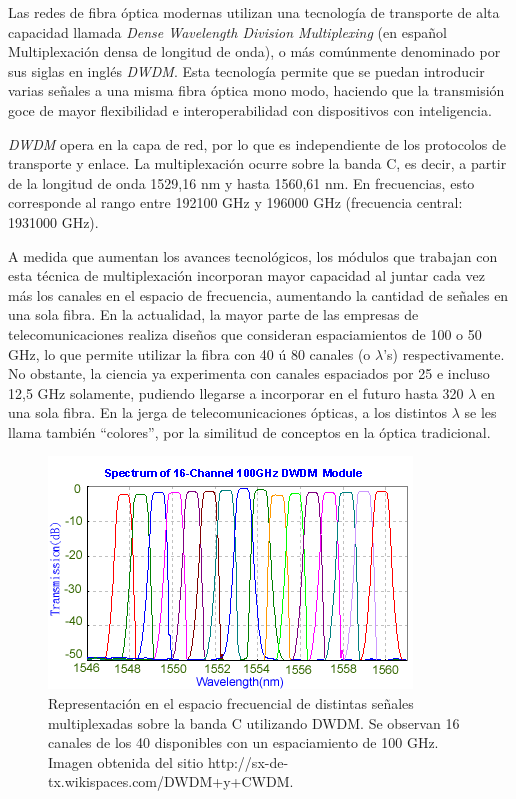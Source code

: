 Las redes de fibra óptica modernas utilizan una tecnología de
transporte de alta capacidad llamada \emph{Dense Wavelength Division
  Multiplexing} (en español Multiplexación densa de longitud de onda),
o más comúnmente denominado por sus siglas en inglés \emph{DWDM}. Esta
tecnología permite que se puedan introducir varias señales a una misma
fibra óptica mono modo, haciendo que la transmisión goce de mayor
flexibilidad e interoperabilidad con dispositivos con inteligencia.

\emph{DWDM} opera en la capa de red, por lo que es independiente de
los protocolos de transporte y enlace. La multiplexación ocurre sobre
la banda C, es decir, a partir de la longitud de onda 1529,16 nm y
hasta 1560,61 nm. En frecuencias, esto corresponde al rango entre
192100 GHz y 196000 GHz (frecuencia central: 1931000 GHz).

A medida que aumentan los avances tecnológicos, los módulos que
trabajan con esta técnica de multiplexación incorporan mayor capacidad
al juntar cada vez más los canales en el espacio de frecuencia,
aumentando la cantidad de señales en una sola fibra. En la actualidad,
la mayor parte de las empresas de telecomunicaciones realiza diseños
que consideran espaciamientos de 100 o 50 GHz, lo que permite utilizar
la fibra con 40 ú 80 canales (o $\lambda$'s) respectivamente. No
obstante, la ciencia ya experimenta con canales espaciados por 25 e
incluso 12,5 GHz solamente, pudiendo llegarse a incorporar en el
futuro hasta 320 $\lambda$ en una sola fibra. En la jerga de
telecomunicaciones ópticas, a los distintos $\lambda$ se les llama
también ``colores'', por la similitud de conceptos en la óptica
tradicional.

\begin{figure}[H]
  \centering
  \includegraphics[scale=1]{Imagenes/DWDM_channels.png}
  \caption{Representación en el espacio frecuencial de distintas
    señales multiplexadas sobre la banda C utilizando DWDM. Se
    observan 16 canales de los 40 disponibles con un espaciamiento de
    100 GHz. Imagen obtenida del sitio
    http://sx-de-tx.wikispaces.com/DWDM+y+CWDM.}
  \label{fig:dwdmchannels}
\end{figure}

